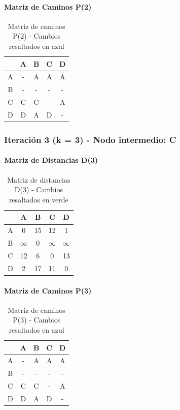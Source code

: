 \documentclass[12pt]{article}
\begin{document}
\paragraph{Matriz de Caminos P(2)}
\begin{table}[h!]
\centering
\begin{tabular}{|c|c|c|c|c|}
\hline
 & A & B & C & D \\\hline
A & - & A & A & A \\\hline
B & - & - & - & - \\\hline
C & C & C & - & A \\\hline
D & D & A & D & - \\\hline
\end{tabular}
\caption{Matriz de caminos P(2) - Cambios resaltados en azul}
\end{table}

\clearpage
\subsubsection{Iteración 3 (k = 3) - Nodo intermedio: C}
\paragraph{Matriz de Distancias D(3)}
\begin{table}[h!]
\centering
\begin{tabular}{|c|c|c|c|c|}
\hline
 & A & B & C & D \\\hline
A & 0 & 15 & 12 & 1 \\\hline
B & $\infty$ & 0 & $\infty$ & $\infty$ \\\hline
C & 12 & 6 & 0 & 13 \\\hline
D & 2 & 17 & 11 & 0 \\\hline
\end{tabular}
\caption{Matriz de distancias D(3) - Cambios resaltados en verde}
\end{table}

\paragraph{Matriz de Caminos P(3)}
\begin{table}[h!]
\centering
\begin{tabular}{|c|c|c|c|c|}
\hline
 & A & B & C & D \\\hline
A & - & A & A & A \\\hline
B & - & - & - & - \\\hline
C & C & C & - & A \\\hline
D & D & A & D & - \\\hline
\end{tabular}
\caption{Matriz de caminos P(3) - Cambios resaltados en azul}
\end{table}
\end{document}
